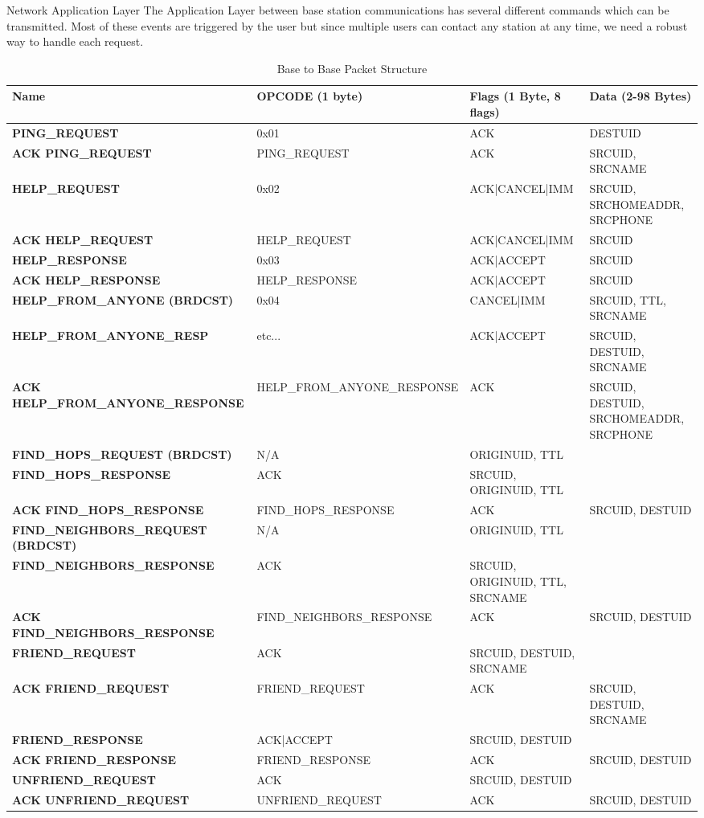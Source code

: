 \documentclass[journal]{IEEEtran}
\begin{document}
Network Application Layer
The Application Layer between base station communications has several different commands which can be transmitted.  Most of these events are triggered by the user but since multiple users can contact any station at any time, we need a robust way to handle each request.

\begin{table*}[t]
  \centering
  \begin{tabular}{>{\bfseries}l|l l l}
    Name & OPCODE (1 byte) & Flags (1 Byte, 8 flags) & Data (2-98 Bytes) \\
    \hline
    PING\_REQUEST & 0x01 & ACK & DESTUID \\
    ACK PING\_REQUEST & PING\_REQUEST & ACK & SRCUID, SRCNAME \\
    HELP\_REQUEST & 0x02 & ACK|CANCEL|IMM & SRCUID, SRCHOMEADDR, SRCPHONE \\
    ACK HELP\_REQUEST & HELP\_REQUEST & ACK|CANCEL|IMM & SRCUID \\
    HELP\_RESPONSE & 0x03 & ACK|ACCEPT & SRCUID \\
    ACK HELP\_RESPONSE & HELP\_RESPONSE & ACK|ACCEPT & SRCUID \\
    HELP\_FROM\_ANYONE (BRDCST) & 0x04 & CANCEL|IMM & SRCUID, TTL, SRCNAME \\
    HELP\_FROM\_ANYONE\_RESP & etc... & ACK|ACCEPT & SRCUID, DESTUID, SRCNAME \\
    ACK HELP\_FROM\_ANYONE\_RESPONSE & HELP\_FROM\_ANYONE\_RESPONSE & ACK & SRCUID, DESTUID, SRCHOMEADDR, SRCPHONE \\
    FIND\_HOPS\_REQUEST (BRDCST) & N/A & ORIGINUID, TTL \\
    FIND\_HOPS\_RESPONSE & ACK & SRCUID, ORIGINUID, TTL \\
    ACK FIND\_HOPS\_RESPONSE & FIND\_HOPS\_RESPONSE & ACK & SRCUID, DESTUID \\
    FIND\_NEIGHBORS\_REQUEST (BRDCST) & N/A & ORIGINUID, TTL \\
    FIND\_NEIGHBORS\_RESPONSE & ACK & SRCUID, ORIGINUID, TTL, SRCNAME \\
    ACK FIND\_NEIGHBORS\_RESPONSE & FIND\_NEIGHBORS\_RESPONSE & ACK & SRCUID, DESTUID \\
    FRIEND\_REQUEST & ACK & SRCUID, DESTUID, SRCNAME \\
    ACK FRIEND\_REQUEST & FRIEND\_REQUEST & ACK & SRCUID, DESTUID, SRCNAME \\
    FRIEND\_RESPONSE & ACK|ACCEPT & SRCUID, DESTUID \\
    ACK FRIEND\_RESPONSE & FRIEND\_RESPONSE & ACK & SRCUID, DESTUID \\
    UNFRIEND\_REQUEST & ACK & SRCUID, DESTUID \\
    ACK UNFRIEND\_REQUEST & UNFRIEND\_REQUEST & ACK & SRCUID, DESTUID
  \end{tabular}
  \caption{Base to Base Packet Structure}
\end{table*}
\end{document}
